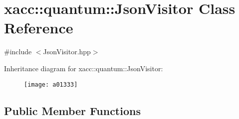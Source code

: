 \hypertarget{a01333}{}\section{xacc\+:\+:quantum\+:\+:Json\+Visitor Class Reference}
\label{a01333}


{\ttfamily \#include $<$Json\+Visitor.\+hpp$>$}

Inheritance diagram for xacc\+:\+:quantum\+:\+:Json\+Visitor\+:\begin{figure}[H]
\begin{center}
\leavevmode
\texttt{[image: a01333]}
\end{center}
\end{figure}
\subsection*{Public Member Functions}
